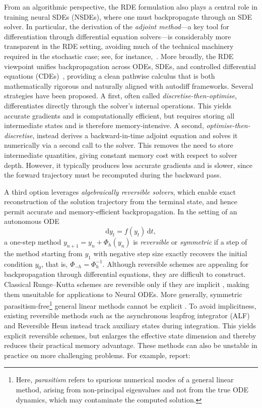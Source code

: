 \documentclass{article}
\theoremstyle{definition}
\theoremstyle{remark}
\begin{document}
From an algorithmic perspective, the RDE formulation also plays a central role in training neural SDEs (NSDEs), where one must backpropagate through an SDE solver. In particular, the derivation of the \emph{adjoint method}---a key tool for differentiation through differential equation solvers---is considerably more transparent in the RDE setting, avoiding much of the technical machinery required in the stochastic case; see, for instance,~\citep[Sec.~3.3.4]{cass_salvi_notes}. More broadly, the RDE viewpoint unifies backpropagation across ODEs, SDEs, and controlled differential equations (CDEs)~\citep{kidger2020neural}, providing a clean pathwise calculus that is both mathematically rigorous and naturally aligned with autodiff frameworks. Several strategies have been proposed. A first, often called \emph{discretise-then-optimise}, differentiates directly through the solver’s internal operations. This yields accurate gradients and is computationally efficient, but requires storing all intermediate states and is therefore memory-intensive. A second, \emph{optimise-then-discretise}, instead derives a backward-in-time adjoint equation and solves it numerically via a second call to the solver. This removes the need to store intermediate quantities, giving constant memory cost with respect to solver depth. However, it typically produces less accurate gradients and is slower, since the forward trajectory must be recomputed during the backward pass.

A third option leverages \emph{algebraically reversible solvers}, which enable exact reconstruction of the solution trajectory from the terminal state, and hence permit accurate and memory-efficient backpropagation. In the setting of an autonomous ODE
\begin{equation} \label{eq:ode}
    \mathrm{d}y_t = f(y_t) \, \mathrm{d}t,
\end{equation}
a one-step method $y_{n+1} = y_n + \Phi_h(y_n)$ is \emph{reversible} or \emph{symmetric} if a step of the method starting from $y_1$ with negative step size exactly recovers the initial condition $y_0$, that is, $\Phi_{-h} = \Phi_h^{-1}$. Although reversible schemes are appealing for backpropagation through differential equations, they are difficult to construct. Classical Runge--Kutta schemes are reversible only if they are implicit \citep[Sec.~2.1]{hairer2006geometric}, making them unsuitable for applications to Neural ODEs. More generally, symmetric parasitism-free\footnote{Here, \emph{parasitism} refers to spurious numerical modes of a general linear method, arising from non-principal eigenvalues and not from the true ODE dynamics, which may contaminate the computed solution.} general linear methods cannot be explicit \citep{butcher2016symmetric}. To avoid implicitness, existing reversible methods such as the asynchronous leapfrog integrator (ALF) \citep{zhuang2021mali} and Reversible Heun \citep{kidger2021efficient} instead track auxiliary states during integration. This yields explicit reversible schemes, but enlarges the effective state dimension and thereby reduces their practical memory advantage. These methods can also be unstable in practice on more challenging problems. For example, \citet{zhang2021path} report:
\end{document}
